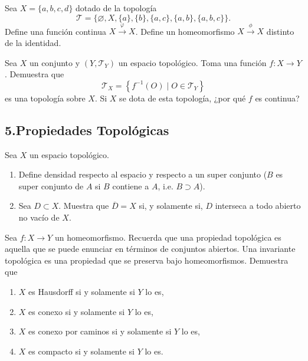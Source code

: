 \documentclass[b5paper,10pt,twoside]{book}
\begin{document}
\begin{problem}
Sea $X = \{a, b, c, d\}$ dotado de la topología
\[
\mathcal{T} = \{\varnothing, X, \{a\}, \{b\}, \{a, c\}, \{a, b\}, \{a, b, c\}\}.
\]
Define una función continua \(X\xrightarrow{\varphi} X\).
Define un homeomorfismo \(X\xrightarrow{\phi} X\) distinto de la identidad.
\end{problem}


\begin{problem}
Sea \(X\) un conjunto y 
\((Y,\mathcal{T}_Y)\) un espacio topológico.
Toma una función \(f\colon X\to Y\).
Demuestra que 
\[
\mathcal{T}_X = \left\{ 
    f^{-1}(O) \mid O\in \mathcal{T}_Y
 \right\}
\]
es una topología sobre \(X\).
Si \(X\) se dota de esta topología,
¿por qué \(f\) es continua?
\end{problem}








\subsection*{5.\enspace Propiedades Topológicas}



\begin{problem}
Sea \(X\)  un espacio topológico.
\begin{enumerate}[label=(\roman*)]
\item Define densidad respecto al espacio y respecto a un super conjunto (\(B\) es super conjunto de \(A\) si \(B\) contiene a \(A\), i.e. \(B\supset A\)).
\item Sea   \(D\subset X\). Muestra que \(\overline{D} = X\) si, y solamente si, \(D\) interseca a todo abierto no vacío de \(X\).
\end{enumerate}



\end{problem}

\begin{problem}
Sea \(f\colon X\to Y\)
un homeomorfismo.
Recuerda que una propiedad topológica es aquella que se puede enunciar en términos de 
conjuntos abiertos.
Una invariante topológica 
es una propiedad que se preserva bajo homeomorfismos.
Demuestra que 
\begin{enumerate}[label=(\roman*)]
\item  \(X\) es Hausdorff si y solamente si  \(Y\) lo es,
\item  \(X\) es conexo si y solamente si  \(Y\) lo es,
\item  \(X\) es conexo por caminos si y solamente si  \(Y\) lo es,
\item  \(X\) es compacto si y solamente si  \(Y\) lo es.
\end{enumerate}
\end{problem}
\end{document}
